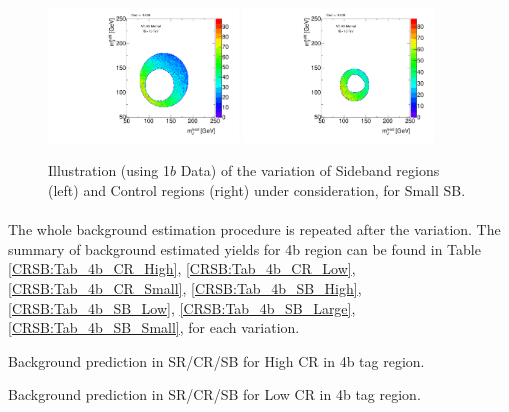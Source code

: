 \begin{figure}[htbp!]
\begin{center}
\includegraphics[angle=270, width=0.45\textwidth]{./figures/boosted/Syst_CRSB/SB_Small_Sideband_OneTag_mH0H1.pdf}
\includegraphics[angle=270, width=0.45\textwidth]{./figures/boosted/Syst_CRSB/SB_Small_Control_OneTag_mH0H1.pdf}\\
\end{center}
\caption{Illustration (using 1$b$ Data) of the variation of Sideband regions (left) and Control regions (right) under consideration, for Small SB.}
\label{CRSB:SB_Small}
\end{figure}

\clearpage
\paragraph{}
The whole background estimation procedure is repeated after the variation. The summary of background estimated yields for 4b region can be found in Table \ref{CRSB:Tab_4b_CR_High}, \ref{CRSB:Tab_4b_CR_Low}, \ref{CRSB:Tab_4b_CR_Small}, \ref{CRSB:Tab_4b_SB_High}, \ref{CRSB:Tab_4b_SB_Low}, \ref{CRSB:Tab_4b_SB_Large},  \ref{CRSB:Tab_4b_SB_Small}, for each variation. 
\begin{table}[htbp!]
\begin{center}

\end{center}
\caption{Background prediction in SR/CR/SB for High CR in 4b tag region.}
\label{CRSB:Tab_4b_CR_High}
\end{table}

\begin{table}[htbp!]
\begin{center}

\end{center}
\caption{Background prediction in SR/CR/SB for Low CR in 4b tag region.}
\label{CRSB:Tab_4b_CR_Low}
\end{table}

